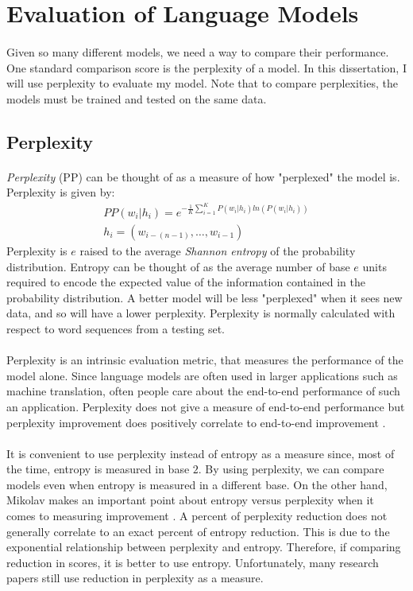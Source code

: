 \documentclass[12pt]{ociamthesis}
\begin{document}
\section {Evaluation of Language Models}
\paragraph{}
Given so many different models, we need a way to compare their performance. One standard comparison score is the perplexity of a model. In this dissertation, I will use perplexity to evaluate my model. Note that to compare perplexities, the models must be trained and tested on the same data.
\subsection{Perplexity}
\paragraph{}
\emph{Perplexity} (PP) can be thought of as a measure of how "perplexed" the model is.
Perplexity is given by:
\begin{align}
PP(w_i | h_i)=e^{- \frac{1}{K} \sum_{i=1}^K P(w_i | h_i ) ln( P(w_i | h_i) ) } 
\\ h_i = ( w_{i-(n-1)},\dots, w_{i-1} )
\end{align}
Perplexity is $e$ raised to the average \emph{Shannon entropy} of the probability distribution. Entropy can be thought of as the average number of base $e$ units required to encode the expected value of the information contained in the probability distribution. A better model will be less "perplexed" when it sees new data, and so will have a lower perplexity.  Perplexity is normally calculated with respect to word sequences from a testing set. 
\paragraph{}
Perplexity is an intrinsic evaluation metric, that measures the performance of the model alone. Since language models are often used in larger applications such as machine translation, often people care about the end-to-end performance of such an application. Perplexity does not give a measure of end-to-end performance but perplexity improvement does positively correlate to end-to-end improvement \cite{Jurafsky2009}.
\paragraph{}
It is convenient to use perplexity instead of entropy as a measure since, most of the time, entropy is measured in base $2$. By using perplexity, we can compare models even when entropy is measured in a different base. On the other hand, Mikolav makes an important point about entropy versus perplexity when it comes to measuring improvement \cite{Mikolav2012}. A percent of perplexity reduction does not generally correlate to an exact percent of entropy reduction. This is due to the exponential relationship between perplexity and entropy. Therefore, if comparing reduction in scores, it is better to use entropy. Unfortunately, many research papers still use reduction in perplexity as a measure.

 
\end{document}
